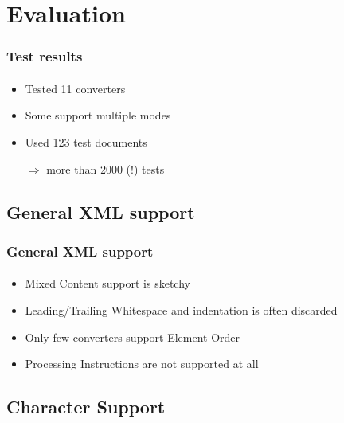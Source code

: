 \documentclass[
    alternativetitlepage=alternativ,
    cornerlogo=hgi_nds_logo2,
    sectionoverview,
]{rubpresentation}
\begin{document}
\section{Evaluation}

\begin{frame}
  \frametitle{Test results}
  \framesubtitle{}
  \begin{itemize}
    \item{} Tested 11 converters
    \item{} Some support multiple modes
    \item{} Used 123 test documents
    \item[$\Rightarrow$]{} more than 2000 (!) tests
  \end{itemize}
\end{frame}

\subsection{General XML support}

\begingroup
  \begin{frame}[fragile]
    \vspace{-1.15cm}
    \begin{center}
      
    \end{center}
  \end{frame}
\endgroup

\begin{frame}
  \frametitle{General XML support}
  \framesubtitle{}
  \begin{itemize}
    \item{} Mixed Content support is sketchy
    \item{} Leading/Trailing Whitespace and indentation is often discarded
    \item{} Only few converters support Element Order
    \item{} Processing Instructions are not supported at all
  \end{itemize}
\end{frame}

\subsection{Character Support}
\end{document}
